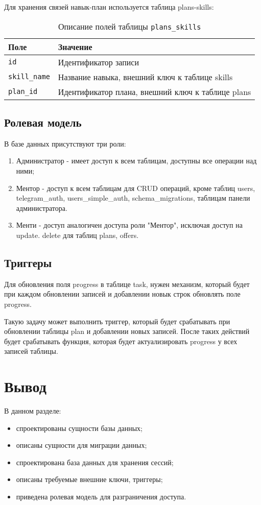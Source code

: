 Для хранения связей навык-план используется таблица plans-skills:
\begin{table}[!ht]
    \caption{Описание полей таблицы \texttt{plans\_skills}}
    \label{tbl:plans-skills}
    \begin{center}
        \begin{tabular}{|p{}p{}|}
            \hline
            \textbf{Поле} & \textbf{Значение} \\\hline
            \texttt{id} & Идентификатор записи \\\hline
            \texttt{skill\_name} & Название навыка, внешний ключ к таблице skills \\\hline
            \texttt{plan\_id} & Идентификатор плана, внешний ключ к таблице plans \\\hline
        \end{tabular}
    \end{center}
\end{table}


\subsection{Ролевая модель}
В базе данных присутствуют три роли:
\begin{enumerate}
\item Администратор - имеет доступ к всем таблицам, доступны все операции над ними;
\item Ментор - доступ к всем таблицам для CRUD операций, кроме таблиц users, telegram\_auth, users\_simple\_auth, schema\_migrations, таблицам панели администратора.
\item Менти - доступ аналогичен доступа роли "Ментор", исключая доступ на update. delete для таблиц plans, offers.
\end{enumerate}

\subsection{Триггеры}
Для обновления поля progress в таблице task, нужен механизм, который будет при каждом обновлении записей и добавлении новык строк обновлять поле progress.  

Такую задачу может выполнить триггер, который будет срабатывать при обновлении таблицы plan и добавлении новых записей. После таких действий будет срабатывать функция, которая будет актуализировать progress у всех записей таблицы.  

\section{Вывод}
В данном разделе:
\begin{itemize}
\item спроектированы сущности базы данных;
\item описаны сущности для миграции данных;
\item спроектирована база данных для хранения сессий;
\item описаны требуемые внешние ключи, триггеры;
\item приведена ролевая модель для разграничения доступа.
\end{itemize}